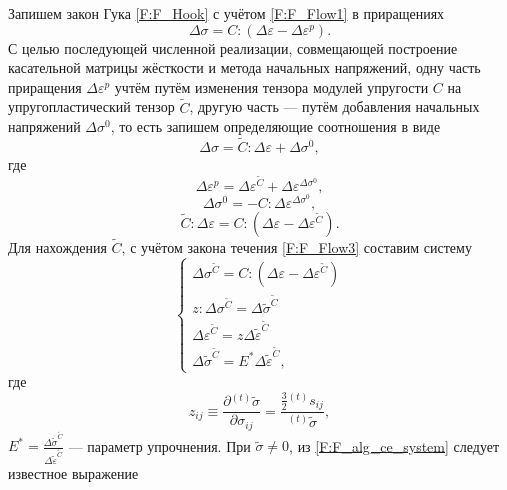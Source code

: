 \documentclass[]{article}
\begin{document}
Запишем закон Гука \eqref{F:F_Hook} с учётом \eqref{F:F_Flow1} в приращениях
\begin{equation}
\Delta\sigma=C:\left(\Delta\varepsilon-\Delta\varepsilon^{p}\right).
\label{F:F_alg_ce1}
\end{equation}
С целью последующей численной реализации, совмещающей построение касательной матрицы жёсткости и метода начальных напряжений, одну часть приращения $\Delta\varepsilon^{p}$ учтём путём изменения тензора модулей упругости $C$ на упругопластический тензор $\tilde{C}$, другую часть --- путём добавления начальных напряжений $\Delta\sigma^{0}$, то есть запишем определяющие соотношения в виде
\begin{equation}
\Delta\sigma=\tilde{C}:\Delta\varepsilon+\Delta\sigma^{0},
\label{F:F_alg_ce_main}
\end{equation}
где
\begin{equation}
\Delta\varepsilon^{p}=\Delta\varepsilon^{\tilde {C}}+\Delta\varepsilon^{\Delta\sigma^{0}},
\label{F:F_alg_ce2}
\end{equation}
\begin{equation}
\Delta\sigma^{0}=-C:\Delta\varepsilon^{\Delta\sigma^{0}},
\label{F:F_alg_ce3}
\end{equation}
\begin{equation}
\tilde{C}:\Delta\varepsilon=C:\left(\Delta\varepsilon-\Delta\varepsilon^{\tilde{C}}\right).
\label{F:F_alg_ce4}
\end{equation}
Для нахождения $\tilde{C}$, с учётом закона течения \eqref{F:F_Flow3} составим систему
\begin{equation}
\begin{cases}
\Delta\sigma^{\tilde{C}}=C:\left(\Delta\varepsilon-\Delta\varepsilon^{\tilde{C}}\right)\\
z:\Delta\sigma^{\tilde{C}}=\Delta\tilde{\sigma}^{\tilde{C}}\\
\Delta\varepsilon^{\tilde{C}}=z \Delta\tilde{\varepsilon}^{\tilde{C}}\\
\Delta\tilde{\sigma}^{\tilde{C}}=E^{*}\Delta\tilde{\varepsilon}^{\tilde{C}},
\end{cases}
\label{F:F_alg_ce_system}
\end{equation}
где
\begin{equation}
z_{ij}\equiv\frac{\partial{}^{(t)}\tilde{\sigma}}{\partial\sigma_{ij}}=\frac{\frac{3}{2}{}^{(t)}s_{ij}}{{}^{(t)}\tilde{\sigma}},
\label{F:F_alg_ce10}
\end{equation}
$E^{*}=\frac{\Delta\tilde{\sigma}^{\tilde{C}}}{\Delta\tilde{\varepsilon}^{\tilde{C}}}$ --- параметр упрочнения. При $\tilde{\sigma}\neq 0$, из \eqref{F:F_alg_ce_system} следует известное \cite{Zienkiewicz1975,Belytschko2000} выражение
\end{document}
